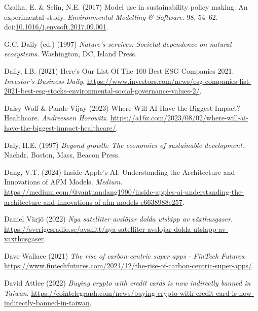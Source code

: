 \documentclass[
  letterpaper,
  DIV=11,
  numbers=noendperiod]{scrartcl}
\newlength{\cslhangindent}
\newenvironment{CSLReferences}[2] %
 {\begin{list}{}{%
  \setlength{\itemindent}{0pt}
  \setlength{\leftmargin}{0pt}
  \setlength{\parsep}{0pt}
  \ifodd #1
   \setlength{\leftmargin}{\cslhangindent}
   \setlength{\itemindent}{-1\cslhangindent}
  \fi
  \setlength{\itemsep}{#2\baselineskip}}}
 {\end{list}}
\begin{document}
\begin{CSLReferences}{0}{1}
Czaika, E. \& Selin, N.E. (2017) Model use in sustainability policy
making: {An} experimental study. \emph{Environmental Modelling \&
Software}. 98, 54--62.
doi:\href{https://doi.org/10.1016/j.envsoft.2017.09.001}{10.1016/j.envsoft.2017.09.001}.

G.C. Daily (ed.) (1997) \emph{Nature's services: Societal dependence on
natural ecosystems}. Washington, DC, Island Press.

Daily, I.B. (2021) Here's {Our List Of The} 100 {Best ESG Companies}
2021. \emph{Investor's Business Daily}.
\url{https://www.investors.com/news/esg-companies-list-2021-best-esg-stocks-environmental-social-governance-values-2/}.

Daisy Wolf \& Pande Vijay (2023) Where {Will AI Have} the {Biggest
Impact}? {Healthcare}. \emph{Andreessen Horowitz}.
\url{https://a16z.com/2023/08/02/where-will-ai-have-the-biggest-impact-healthcare/}.

Daly, H.E. (1997) \emph{Beyond growth: The economics of sustainable
development}. Nachdr. Boston, Mass, Beacon Press.

Dang, V.T. (2024) Inside {Apple}'s {AI}: {Understanding} the
{Architecture} and {Innovations} of {AFM Models}. \emph{Medium}.
\url{https://medium.com/@vantuandang1990/inside-apples-ai-understanding-the-architecture-and-innovations-of-afm-models-e6638988e257}.

Daniel Värjö (2022) \emph{{Nya satelliter avsl{ö}jar dolda utsl{ä}pp av
v{ä}xthusgaser}}.
\url{https://sverigesradio.se/avsnitt/nya-satelliter-avslojar-dolda-utslapp-av-vaxthusgaser}.

Dave Wallace (2021) \emph{The rise of carbon-centric super apps -
{FinTech Futures}}.
\url{https://www.fintechfutures.com/2021/12/the-rise-of-carbon-centric-super-apps/}.

David Attlee (2022) \emph{Buying crypto with credit cards is now
indirectly banned in {Taiwan}}.
\url{https://cointelegraph.com/news/buying-crypto-with-credit-card-is-now-indirectly-banned-in-taiwan}.


\end{CSLReferences}
\end{document}
